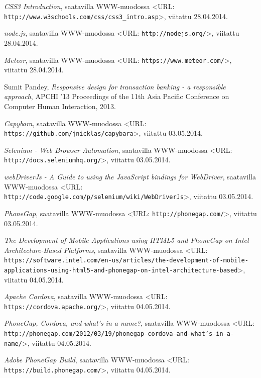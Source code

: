 \documentclass[finnish,nonumbib,nocopyright]{gradu2}
\begin{document}
\begin{thebibliography}{9}
\textit{CSS3 Introduction}, saatavilla WWW-muodossa
<URL: \texttt{http://www.w3schools.com/css/css3\_intro.asp}>, viitattu 28.04.2014.

\textit{node.js}, saatavilla WWW-muodossa
<URL: \texttt{http://nodejs.org/}>, viitattu 28.04.2014.

\textit{Meteor}, saatavilla WWW-muodossa
<URL: \texttt{https://www.meteor.com/}>, viitattu 28.04.2014.

Sumit Pandey, \textit{Responsive design for transaction banking - a responsible approach},
APCHI '13 Proceedings of the 11th Asia Pacific Conference on Computer Human Interaction, 2013.

\textit{Capybara}, saatavilla WWW-muodossa
<URL: \texttt{https://github.com/jnicklas/capybara}>, viitattu 03.05.2014.

\textit{Selenium - Web Browser Automation}, saatavilla WWW-muodossa
<URL: \texttt{http://docs.seleniumhq.org/}>, viitattu 03.05.2014.

\textit{webDriverJs - A Guide to using the JavaScript bindings for WebDriver}, saatavilla WWW-muodossa
<URL: \texttt{http://code.google.com/p/selenium/wiki/WebDriverJs}>, viitattu 03.05.2014.

\textit{PhoneGap}, saatavilla WWW-muodossa
<URL: \texttt{http://phonegap.com/}>, viitattu 03.05.2014.

\textit{The Development of Mobile Applications using HTML5 and PhoneGap on Intel Architecture-Based Platforms}, saatavilla WWW-muodossa
<URL: \texttt{https://software.intel.com/en-us/articles/the-development-of-mobile-applications-using-html5-and-phonegap-on-intel-architecture-based}>, viitattu 04.05.2014.
 
\textit{Apache Cordova}, saatavilla WWW-muodossa
<URL: \texttt{https://cordova.apache.org/}>, viitattu 04.05.2014.
 
\textit{PhoneGap, Cordova, and what’s in a name?}, saatavilla WWW-muodossa
<URL: \texttt{http://phonegap.com/2012/03/19/phonegap-cordova-and-what’s-in-a-name/}>, viitattu 04.05.2014.
 
\textit{Adobe PhoneGap Build}, saatavilla WWW-muodossa
<URL: \texttt{https://build.phonegap.com/}>, viitattu 04.05.2014.

\end{thebibliography}
\end{document}
